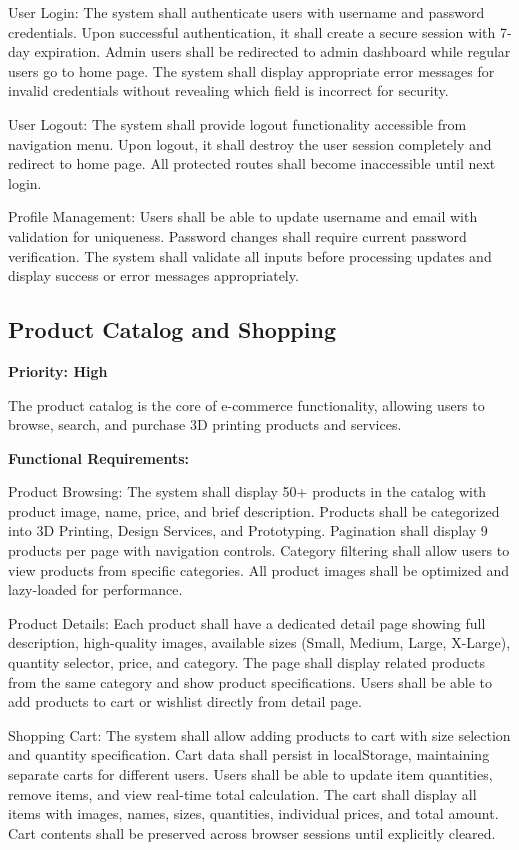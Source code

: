 ﻿\documentclass[11pt]{article}
\begin{document}
User Login: The system shall authenticate users with username and password credentials. Upon successful authentication, it shall create a secure session with 7-day expiration. Admin users shall be redirected to admin dashboard while regular users go to home page. The system shall display appropriate error messages for invalid credentials without revealing which field is incorrect for security.

User Logout: The system shall provide logout functionality accessible from navigation menu. Upon logout, it shall destroy the user session completely and redirect to home page. All protected routes shall become inaccessible until next login.

Profile Management: Users shall be able to update username and email with validation for uniqueness. Password changes shall require current password verification. The system shall validate all inputs before processing updates and display success or error messages appropriately.

\subsection{Product Catalog and Shopping}
\textbf{Priority: High}

The product catalog is the core of e-commerce functionality, allowing users to browse, search, and purchase 3D printing products and services.

\textbf{Functional Requirements:}

Product Browsing: The system shall display 50+ products in the catalog with product image, name, price, and brief description. Products shall be categorized into 3D Printing, Design Services, and Prototyping. Pagination shall display 9 products per page with navigation controls. Category filtering shall allow users to view products from specific categories. All product images shall be optimized and lazy-loaded for performance.

Product Details: Each product shall have a dedicated detail page showing full description, high-quality images, available sizes (Small, Medium, Large, X-Large), quantity selector, price, and category. The page shall display related products from the same category and show product specifications. Users shall be able to add products to cart or wishlist directly from detail page.

Shopping Cart: The system shall allow adding products to cart with size selection and quantity specification. Cart data shall persist in localStorage, maintaining separate carts for different users. Users shall be able to update item quantities, remove items, and view real-time total calculation. The cart shall display all items with images, names, sizes, quantities, individual prices, and total amount. Cart contents shall be preserved across browser sessions until explicitly cleared.
\end{document}
